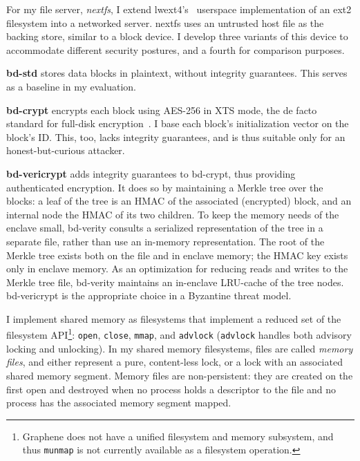 %
For my file server, \emph{nextfs}, I extend lwext4's~\cite{lwext4} userspace
implementation of an ext2 filesystem into a networked server.
%
nextfs uses an untrusted host file as the backing store, similar to a block
device.
%
I develop three variants of this device to accommodate different security
postures, and a fourth for comparison purposes.

\vspace*{-0.5\baselineskip}
\begin{widelist}

\item 
%
\textbf{bd-std} stores data blocks in plaintext, without integrity
guarantees. This serves as a baseline in my evaluation.


\item
%
\textbf{bd-crypt} encrypts each block using AES-256 in XTS mode, the de
	facto standard for full-disk encryption~\cite{xts-ieee,xts-nist}.
%
I base each block's initialization vector on the block's ID.
%
This, too, lacks integrity guarantees, and is thus suitable only for an
	honest-but-curious attacker.


\item
%
\textbf{bd-vericrypt} adds integrity guarantees to bd-crypt, thus
	providing authenticated encryption.  It does so by maintaining a
	Merkle tree over the blocks: a leaf of the tree is an HMAC of the
	associated (encrypted) block, and an internal node the HMAC of its
	two children.
%
To keep the memory needs of the enclave small, bd-verity consults a
	serialized representation of the tree in a separate file, rather
	than use an in-memory representation.
%
The root of the Merkle tree exists both on the file and in enclave
	memory; the HMAC key exists only in enclave memory.
%
As an optimization for reducing reads and writes to the Merkle tree
	file, bd-verity maintains an in-enclave LRU-cache of the tree
	nodes.
	bd-vericrypt is the appropriate choice in a Byzantine threat model.
	

\end{widelist}


%
I implement shared memory as filesystems that implement a
reduced set of the filesystem API\footnote{Graphene does not have a
unified filesystem and memory subsystem, and
thus \texttt{munmap} is not currently available as a filesystem operation.
}:
\texttt{open}, \texttt{close}, \texttt{mmap}, and \texttt{advlock}
(\texttt{advlock} handles both advisory locking and unlocking).
%
In my shared memory filesystems, files are called \emph{memory files}, and
either represent a pure, content-less lock, or a lock with an associated
shared memory segment.
% 
Memory files are non-persistent: they are created on the first open and
destroyed when no process holds a descriptor to the file and no process has the
associated memory segment mapped.


